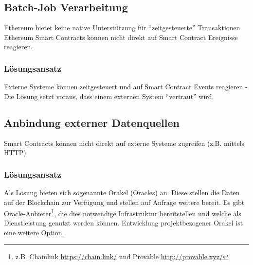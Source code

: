 \subsection*{Batch-Job Verarbeitung}
Ethereum bietet keine native Unterstützung für “zeitgesteuerte” Transaktionen.
Ethereum Smart Contracts können nicht direkt auf Smart Contract Ereignisse reagieren.

\subsubsection*{Lösungsansatz}
Externe Systeme können zeitgesteuert und auf Smart Contract Events reagieren - Die Lösung setzt voraus, dass einem externen System “vertraut” wird.


\subsection*{Anbindung externer Datenquellen}
Smart Contracts können nicht direkt auf externe Systeme zugreifen (z.B. mittels HTTP)

\subsubsection*{Lösungsansatz}
Als Lösung bieten sich sogenannte Orakel (Oracles) an. Diese stellen die Daten auf der Blockchain zur Verfügung und stellen auf Anfrage weitere bereit. Es gibt Oracle-Anbieter\footnote{z.B. Chainlink \url{https://chain.link/} und Provable \url{http://provable.xyz/}}, die dies notwendige Infrastruktur bereitstellen und welche als Dienstleistung genutzt werden können. Entwicklung projektbezogener Orakel ist eine weitere Option.

